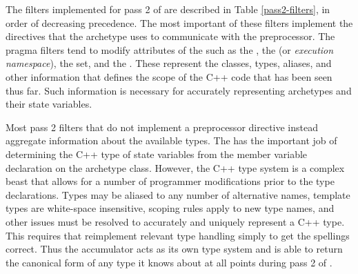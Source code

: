 The filters implemented for pass 2 of \cycpp are described in Table \ref{pass2-filters}, 
in order of decreasing precedence. The most important of these filters implement 
the  directives that the archetype uses to communicate
with the preprocessor.  The pragma filters tend to modify attributes of
the  such as the , the  
(or \emph{execution namespace}), the  set, and the . 
These represent the classes, types, aliases, and other information that defines
the scope of the C++ code that has been seen thus far. Such information is necessary 
for accurately representing archetypes and their state variables. 

Most pass 2 filters that do not implement a preprocessor directive instead
aggregate information about the available types. The  has
the important job of determining the C++ type of state variables from the 
member variable declaration on the archetype class. However, the C++ type system 
is a complex beast that allows for a number of programmer modifications prior 
to the type declarations.  Types may be aliased to any number of alternative 
names, template types are white-space insensitive, scoping rules apply 
to new type names, and other issues must be resolved to accurately and uniquely 
represent a C++ type.  This requires that \cycpp reimplement relevant type handling
simply to get the spellings correct. 
Thus the  accumulator acts as its own type system and is 
able to return the canonical form of any type it knows about at all points during 
pass 2 of \cycpp.

